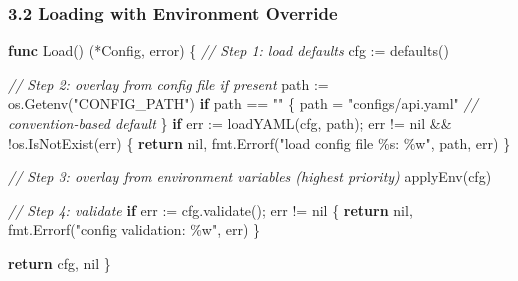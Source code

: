 \documentclass[
]{article}
\newenvironment{Shaded}{}{}
\newcommand{\CommentTok}[1]{\textcolor[rgb]{0.38,0.63,0.69}{\textit{#1}}}
\newcommand{\ControlFlowTok}[1]{\textcolor[rgb]{0.00,0.44,0.13}{\textbf{#1}}}
\newcommand{\DataTypeTok}[1]{\textcolor[rgb]{0.56,0.13,0.00}{#1}}
\newcommand{\KeywordTok}[1]{\textcolor[rgb]{0.00,0.44,0.13}{\textbf{#1}}}
\newcommand{\NormalTok}[1]{#1}
\newcommand{\OperatorTok}[1]{\textcolor[rgb]{0.40,0.40,0.40}{#1}}
\newcommand{\OtherTok}[1]{\textcolor[rgb]{0.00,0.44,0.13}{#1}}
\newcommand{\StringTok}[1]{\textcolor[rgb]{0.25,0.44,0.63}{#1}}
\begin{document}
\hypertarget{loading-with-environment-override}{%
\subsubsection{3.2 Loading with Environment
Override}\label{loading-with-environment-override}}

\begin{Shaded}
\begin{Highlighting}[]
\KeywordTok{func}\NormalTok{ Load}\OperatorTok{()} \OperatorTok{(*}\NormalTok{Config}\OperatorTok{,} \DataTypeTok{error}\OperatorTok{)} \OperatorTok{\{}
    \CommentTok{// Step 1: load defaults}
\NormalTok{    cfg }\OperatorTok{:=}\NormalTok{ defaults}\OperatorTok{()}

    \CommentTok{// Step 2: overlay from config file if present}
\NormalTok{    path }\OperatorTok{:=}\NormalTok{ os}\OperatorTok{.}\NormalTok{Getenv}\OperatorTok{(}\StringTok{"CONFIG\_PATH"}\OperatorTok{)}
    \ControlFlowTok{if}\NormalTok{ path }\OperatorTok{==} \StringTok{""} \OperatorTok{\{}
\NormalTok{        path }\OperatorTok{=} \StringTok{"configs/api.yaml"} \CommentTok{// convention{-}based default}
    \OperatorTok{\}}
    \ControlFlowTok{if}\NormalTok{ err }\OperatorTok{:=}\NormalTok{ loadYAML}\OperatorTok{(}\NormalTok{cfg}\OperatorTok{,}\NormalTok{ path}\OperatorTok{);}\NormalTok{ err }\OperatorTok{!=} \OtherTok{nil} \OperatorTok{\&\&} \OperatorTok{!}\NormalTok{os}\OperatorTok{.}\NormalTok{IsNotExist}\OperatorTok{(}\NormalTok{err}\OperatorTok{)} \OperatorTok{\{}
        \ControlFlowTok{return} \OtherTok{nil}\OperatorTok{,}\NormalTok{ fmt}\OperatorTok{.}\NormalTok{Errorf}\OperatorTok{(}\StringTok{"load config file \%s: \%w"}\OperatorTok{,}\NormalTok{ path}\OperatorTok{,}\NormalTok{ err}\OperatorTok{)}
    \OperatorTok{\}}

    \CommentTok{// Step 3: overlay from environment variables (highest priority)}
\NormalTok{    applyEnv}\OperatorTok{(}\NormalTok{cfg}\OperatorTok{)}

    \CommentTok{// Step 4: validate}
    \ControlFlowTok{if}\NormalTok{ err }\OperatorTok{:=}\NormalTok{ cfg}\OperatorTok{.}\NormalTok{validate}\OperatorTok{();}\NormalTok{ err }\OperatorTok{!=} \OtherTok{nil} \OperatorTok{\{}
        \ControlFlowTok{return} \OtherTok{nil}\OperatorTok{,}\NormalTok{ fmt}\OperatorTok{.}\NormalTok{Errorf}\OperatorTok{(}\StringTok{"config validation: \%w"}\OperatorTok{,}\NormalTok{ err}\OperatorTok{)}
    \OperatorTok{\}}

    \ControlFlowTok{return}\NormalTok{ cfg}\OperatorTok{,} \OtherTok{nil}
\OperatorTok{\}}


\end{Highlighting}
\end{Shaded}
\end{document}
